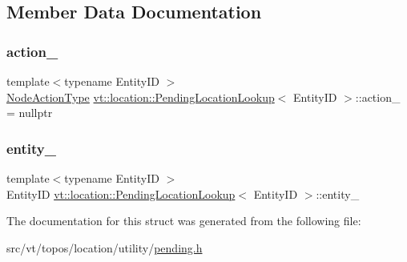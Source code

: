 \subsection{Member Data Documentation}
\mbox{\label{structvt_1_1location_1_1_pending_location_lookup_a601536844f9545be1cdf913fcd49d393}} 
\subsubsection{\texorpdfstring{action\+\_\+}{action\_}}
{\footnotesize\ttfamily template$<$typename Entity\+ID $>$ \\
\hyperlink{namespacevt_1_1location_a3a9235e0ceb341bef225d2cc46606e9e}{Node\+Action\+Type} \hyperlink{structvt_1_1location_1_1_pending_location_lookup}{vt\+::location\+::\+Pending\+Location\+Lookup}$<$ Entity\+ID $>$\+::action\+\_\+ = nullptr\hspace{0.3cm}{\ttfamily [private]}}

\mbox{\label{structvt_1_1location_1_1_pending_location_lookup_ac35da0e44b6048e6cc893f1498f1aa1d}} 
\subsubsection{\texorpdfstring{entity\+\_\+}{entity\_}}
{\footnotesize\ttfamily template$<$typename Entity\+ID $>$ \\
Entity\+ID \hyperlink{structvt_1_1location_1_1_pending_location_lookup}{vt\+::location\+::\+Pending\+Location\+Lookup}$<$ Entity\+ID $>$\+::entity\+\_\+\hspace{0.3cm}{\ttfamily [private]}}



The documentation for this struct was generated from the following file\+:\begin{DoxyCompactItemize}
\item 
src/vt/topos/location/utility/\hyperlink{pending_8h}{pending.\+h}\end{DoxyCompactItemize}
